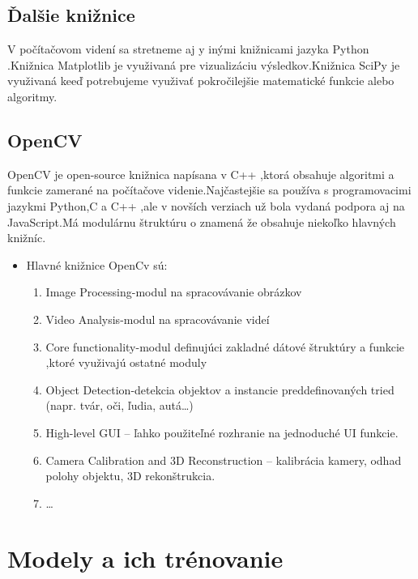 \documentclass[10pt,twoside,slovak,a4paper]{coursepaper}
\begin{document}
\subsection{Ďalšie knižnice  } \label{ina:nejake}
V počítačovom videní sa stretneme aj y inými knižnicami jazyka Python .Knižnica Matplotlib je využivaná pre vizualizáciu  výsledkov.Knižnica SciPy je využivaná keeď potrebujeme využivať pokročilejšie matematické funkcie alebo algoritmy.


\subsection{OpenCV} \label{ina:nejake}
OpenCV je  open-source knižnica napísana v C++ ,ktorá obsahuje algoritmi a funkcie zamerané na počítačove videnie.Najčastejšie sa používa s programovacimi jazykmi Python,C a C++ ,ale v novších verziach už bola vydaná podpora aj na JavaScript.Má modulárnu štruktúru o znamená že obsahuje niekoľko hlavných knižníc.
\begin{itemize}
\item Hlavné knižnice OpenCv sú:
	\begin{enumerate}
	\item Image Processing-modul na spracovávanie obrázkov
	\item Video Analysis-modul na spracovávanie videí
	\item Core functionality-modul definujúci zakladné dátové štruktúry a funkcie ,ktoré využivajú ostatné moduly
	\item Object Detection-detekcia objektov a instancie preddefinovaných tried (napr. tvár, oči, ľudia, autá…)
	\item High-level GUI – ľahko použiteľné rozhranie na jednoduché UI funkcie.
	\item Camera Calibration and 3D Reconstruction  – kalibrácia kamery, odhad polohy objektu, 3D rekonštrukcia.
	\item \ldots{}
	\end{enumerate}
\end{itemize}

\section{Modely a ich trénovanie} \label{nejaka}
\cite{CV-Framework}
\end{document}
